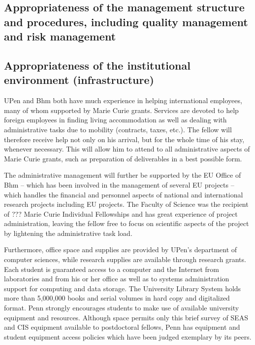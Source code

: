 \documentclass{article}[11pt]
\begin{document}
\subsection{Appropriateness of the management structure and procedures, including quality management and risk management}


\subsection{Appropriateness of the institutional environment (infrastructure)}
UPen and Bhm both have much experience in helping international employees, many of whom supported by Marie Curie grants. Services are devoted to help foreign employees in finding living accommodation as well as dealing with administrative tasks due to mobility (contracts, taxes, etc.). The fellow
will therefore receive help not only on his arrival, but for the whole time of his stay, whenever necessary. This will allow him to attend to all administrative aspects of Marie Curie grants, such as preparation of deliverables in a best possible form.

The administrative management will further be supported by the EU Office of Bhm – which has been involved in the management of several EU projects – which handles the financial and personnel aspects of national and international research projects including EU projects. The Faculty of Science was the recipient of ??? Marie Curie Individual Fellowships and has great experience of project administration, leaving the fellow free to focus on scientific aspects of the project by lightening the administrative task load.

Furthermore, office space and supplies are provided by UPen's department of computer sciences, while research supplies are available through research grants. Each student is guaranteed access to a computer and the Internet from laboratories and from his or her office as well as to systems administration support for computing and data storage. The University Library System holds more than 5,000,000 books and serial volumes in hard copy and digitalized format. Penn strongly encourages students to make use of available university equipment and resources.  Although space permits only this brief survey of SEAS and CIS equipment available to postdoctoral fellows, Penn has equipment and student equipment access policies which have been judged exemplary by its peers.
\end{document}

